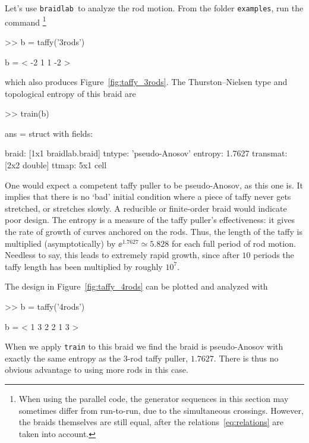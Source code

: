 \documentclass[12pt]{article}
\newcommand{\braidlab}{\texttt{braidlab}}%
\newcommand{\braid}{\texttt{braid}}%
\begin{document}
Let's use \braidlab\ to analyze the rod motion.  From the folder
\lstinline{examples}, run the command%
%
\footnote{When using the parallel code, the generator sequences in this
  section may sometimes differ from run-to-run, due to the simultaneous
  crossings.  However, the braids themselves are still equal, after the
  relations~\eqref{eq:relations} are taken into account.}
%
%
\begin{lstbraidlab}
>> b = taffy('3rods')

b = < -2  1  1 -2 >
\end{lstbraidlab}
which also produces Figure~\ref{fig:taffy_3rods}.  The Thurston--Nielsen %
%
type and topological entropy %
%
of this braid are %
\index{braid class@\braid\ class!train@\lstinline{train}|(}%
\begin{lstbraidlab}
>> train(b)

ans = struct with fields:

       braid: [1x1 braidlab.braid]
      tntype: 'pseudo-Anosov'
     entropy: 1.7627
    transmat: [2x2 double]
       ttmap: {5x1 cell}
\end{lstbraidlab}
One would expect a competent taffy puller to be pseudo-Anosov, %
%
as this one is.  It implies that there is no `bad' initial condition where a
piece of taffy never gets stretched, or stretches slowly.  A reducible or
finite-order braid would indicate poor design.  The entropy is a measure of
the taffy puller's effectiveness: it gives the rate of growth of curves
anchored on the rods.  Thus, the length of the taffy is multiplied
(asymptotically) by $\ee^{1.7627} \simeq 5.828$ for each full period of rod
motion.  Needless to say, this leads to extremely rapid growth, since after
$10$ periods the taffy length has been multiplied by roughly $10^7$.

The design in Figure~\ref{fig:taffy_4rods} can be plotted and analyzed with
\begin{lstbraidlab}
>> b = taffy('4rods')

b = < 1  3  2  2  1  3 >
\end{lstbraidlab}
When we apply \lstinline{train} to this braid we find the braid is
pseudo-Anosov with exactly the same entropy as the 3-rod taffy puller,
$1.7627$.  There is thus no obvious advantage to using more rods in this case.
\end{document}
